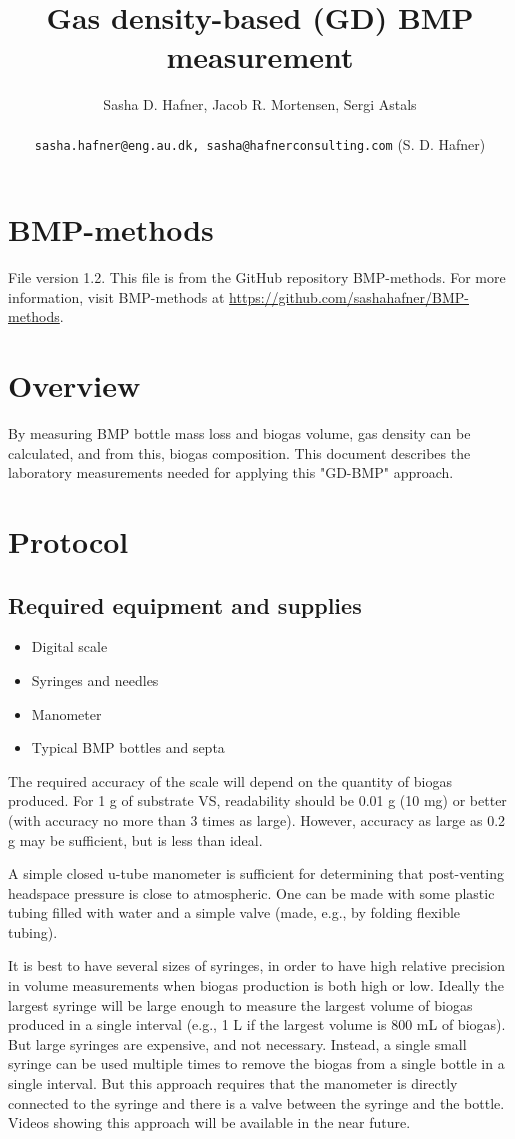 \documentclass[]{article}
\title {Gas density-based (GD) BMP measurement}
\author{Sasha D. Hafner, Jacob R. Mortensen, Sergi Astals\\
\\
\texttt{sasha.hafner@eng.au.dk, sasha@hafnerconsulting.com} (S. D. Hafner)
}
\begin{document}
\maketitle

\section{BMP-methods}
File version 1.2. 
This file is from the GitHub repository BMP-methods.
For more information, visit BMP-methods at \url{https://github.com/sashahafner/BMP-methods}.

\section{Overview}
By measuring BMP bottle mass loss and biogas volume, gas density can be calculated, and from this, biogas composition.
This document describes the laboratory measurements needed for applying this "GD-BMP" approach.

\section{Protocol}

\subsection{Required equipment and supplies}

\begin{itemize}
    \item Digital scale
    \item Syringes and needles
    \item Manometer
    \item Typical BMP bottles and septa
\end{itemize}

The required accuracy of the scale will depend on the quantity of biogas produced. 
For 1 g of substrate VS, readability should be 0.01 g (10 mg) or better (with accuracy no more than 3 times as large).
However, accuracy as large as 0.2 g may be sufficient, but is less than ideal.

A simple closed u-tube manometer is sufficient for determining that post-venting headspace pressure is close to atmospheric.
One can be made with some plastic tubing filled with water and a simple valve (made, e.g., by folding flexible tubing).

It is best to have several sizes of syringes, in order to have high relative precision in volume measurements when biogas production is both high or low.
Ideally the largest syringe will be large enough to measure the largest volume of biogas produced in a single interval (e.g., 1 L if the largest volume is 800 mL of biogas).
But large syringes are expensive, and not necessary.
Instead, a single small syringe can be used multiple times to remove the biogas from a single bottle in a single interval.
But this approach requires that the manometer is directly connected to the syringe and there is a valve between the syringe and the bottle.
Videos showing this approach will be available in the near future.
\end{document}
